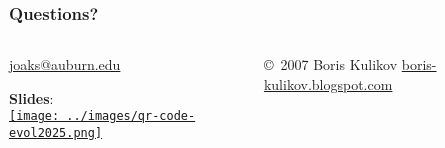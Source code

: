 \begin{frame}
    \frametitle{Questions?}    
    \begin{columns}[c]

        \begin{minipage}[c][\frametextheight][c]{\columnwidth}
        \begin{center}
            {
            \Large
            \href{mailto:joaks@auburn.edu}{joaks@auburn.edu}

            }

            \bigskip
            \begin{center}
                \textbf{Slides}:\\
                \href{https://phyletica.org/slides/evol2025.pdf}{%
                \texttt{[image: ../images/qr-code-evol2025.png]}}
            \end{center}
        \end{center}
        \end{minipage}


        \begin{minipage}[t][\frametextheight][b]{\columnwidth}
            \begin{figure}
                \begin{center}
                \vspace{-2.0mm}
                \caption{\tiny \copyright~2007 Boris Kulikov \href{https://boris-kulikov.blogspot.com/}{boris-kulikov.blogspot.com}}
                \end{center}
            \end{figure}
        \end{minipage}

    \end{columns}
\end{frame}

